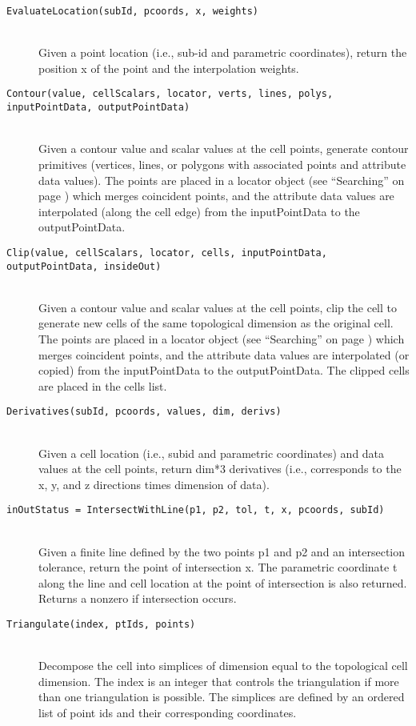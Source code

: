 \begin{description}
\begin{description}
    \item[\texttt{EvaluateLocation(subId, pcoords, x, weights)}] \hfill \\
    Given a point location (i.e., sub-id and parametric coordinates), return the position x of the point and the interpolation weights.

    \item[\texttt{Contour(value, cellScalars, locator, verts, lines, polys, inputPointData, outputPointData)}] \hfill \\
    Given a contour value and scalar values at the cell points, generate contour primitives (vertices, lines, or polygons with associated points and attribute data values). The points are placed in a locator object (see ``Searching'' on page \pageref{subsec:searching}) which merges coincident points, and the attribute data values are interpolated (along the cell edge) from the inputPointData to the outputPointData.

    \item[\texttt{Clip(value, cellScalars, locator, cells, inputPointData, outputPointData, insideOut)}] \hfill \\
    Given a contour value and scalar values at the cell points, clip the cell to generate new cells of the same topological dimension as the original cell. The points are placed in a locator object (see ``Searching'' on page \pageref{subsec:searching}) which merges coincident points, and the attribute data values are interpolated (or copied) from the inputPointData to the outputPointData. The clipped cells are placed in the cells list.

    \item[\texttt{Derivatives(subId, pcoords, values, dim, derivs)}] \hfill \\
    Given a cell location (i.e., subid and parametric coordinates) and data values at the cell points, return dim*3 derivatives (i.e., corresponds to the x, y, and z directions times dimension of data).

    \item[\texttt{inOutStatus = IntersectWithLine(p1, p2, tol, t, x, pcoords, subId)}] \hfill \\
    Given a finite line defined by the two points p1 and p2 and an intersection tolerance, return the point of intersection x. The parametric coordinate t along the line and cell location at the point of intersection is also returned. Returns a nonzero if intersection occurs.

    \item[\texttt{Triangulate(index, ptIds, points)}] \hfill \\
    Decompose the cell into simplices of dimension equal to the topological cell dimension. The index is an integer that controls the triangulation if more than one triangulation  is possible. The simplices are defined by an ordered list of point ids and their corresponding coordinates.


\end{description}
\end{description}
